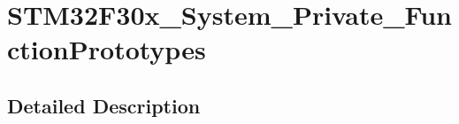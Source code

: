\hypertarget{group___s_t_m32_f30x___system___private___function_prototypes}{\section{S\-T\-M32\-F30x\-\_\-\-System\-\_\-\-Private\-\_\-\-Function\-Prototypes}
\label{group___s_t_m32_f30x___system___private___function_prototypes}
}


\subsection{Detailed Description}

